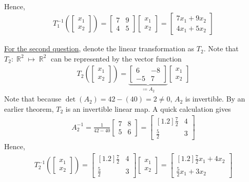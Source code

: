 \documentclass{amsart}
\theoremstyle{definition}
\theoremstyle{definition}
\DeclareMathOperator{\R}{\mathbb{R}}
\DeclareMathOperator{\1}{\mathbbm{1}}
\begin{document}
\begin{enumerate}[itemsep = 2mm]
\begin{align*}
		\end{align*}
		Hence,
		\begin{align}
		\label{eq1}
		T_1^{-1} \left( \begin{bmatrix} x_1 \\ x_2 \end{bmatrix} \right) = \begin{bmatrix} 7 & 9 \\ 4 & 5 \end{bmatrix}  \begin{bmatrix} x_1 \\ x_2 \end{bmatrix} = \begin{bmatrix} 7 x_1 + 9 x_2 \\ 4 x_1 + 5x_2 \end{bmatrix}
		\end{align}
		
		\uline{For the second question}, denote the linear transformation as $T_2$. Note that $T_2 : \R^2 \mapsto \R^2$ can be represented by the vector function
		\begin{align*}
		T_2 \left( \begin{bmatrix} x_1 \\ x_2 \end{bmatrix} \right) = \underbrace{ \begin{bmatrix} 6 & -8 \\ -5 & 7 \end{bmatrix} }_{\coloneqq A_2} \begin{bmatrix} x_1 \\ x_2 \end{bmatrix}
		\end{align*}
		Note that because $\det (A_2) = 42 - (40) = 2 \neq 0$, $A_2$ is invertible. By an earlier theorem, $T_2$ is an invertible linear map. A quick calculation gives
		\begin{align*}
		A_2^{-1} = \frac{1}{42- 40} \begin{bmatrix} 7 & 8 \\ 5 & 6 \end{bmatrix} = \begin{bmatrix}[1.2] \frac{7}{2} & 4 \\ \frac{5}{2} & 3 \end{bmatrix} 
		\end{align*}
		Hence,
		\begin{align}
		\label{eq2}
		T_2^{-1} \left( \begin{bmatrix} x_1 \\ x_2 \end{bmatrix} \right) = \begin{bmatrix}[1.2] \frac{7}{2} & 4 \\ \frac{5}{2} & 3 \end{bmatrix}  \begin{bmatrix} x_1 \\ x_2 \end{bmatrix} = \begin{bmatrix}[1.2] \frac{7}{2} x_1 + 4 x_2 \\ \frac{5}{2} x_1 + 3 x_2 \end{bmatrix}
		\end{align}
				

\end{enumerate}
\end{document}
